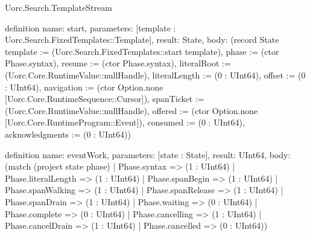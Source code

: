 \begin{lexlean}{Uorc.Search.TemplateStream}
\begin{semanticmodule}
definition{
  name: start,
  parameters: [template : Uorc.Search.FixedTemplates::Template],
  result: State,
  body: (record State {template := (Uorc.Search.FixedTemplates::start template), phase := (ctor Phase.syntax), resume := (ctor Phase.syntax), literalRoot := (Uorc.Core.RuntimeValue::nullHandle), literalLength := (0 : UInt64), offset := (0 : UInt64), navigation := (ctor Option.none [Uorc.Core.RuntimeSequence::Cursor]), spanTicket := (Uorc.Core.RuntimeValue::nullHandle), offered := (ctor Option.none [Uorc.Core.RuntimeProgram::Event]), consumed := (0 : UInt64), acknowledgments := (0 : UInt64)})
}

definition{
  name: eventWork,
  parameters: [state : State],
  result: UInt64,
  body: (match (project state phase)
    | Phase.syntax => (1 : UInt64)
    | Phase.literalLength => (1 : UInt64)
    | Phase.spanBegin => (1 : UInt64)
    | Phase.spanWalking => (1 : UInt64)
    | Phase.spanRelease => (1 : UInt64)
    | Phase.spanDrain => (1 : UInt64)
    | Phase.waiting => (0 : UInt64)
    | Phase.complete => (0 : UInt64)
    | Phase.cancelling => (1 : UInt64)
    | Phase.cancelDrain => (1 : UInt64)
    | Phase.cancelled => (0 : UInt64))
}


\end{semanticmodule}
\end{lexlean}
